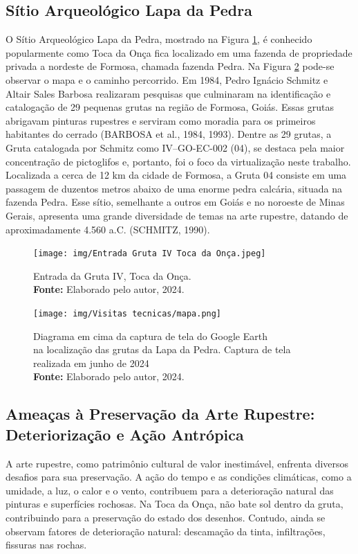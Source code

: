 \subsection {Sítio Arqueológico Lapa da Pedra}\label{sec:sitio lapa da pedra}
O Sítio Arqueológico Lapa da Pedra, mostrado na Figura \ref{fig:Entrada da Gruta IV,Toca da Onça}, é conhecido popularmente como Toca da Onça fica localizado em uma fazenda de propriedade privada a nordeste de Formosa, chamada fazenda Pedra. Na Figura \ref{fig:mapa} pode-se observar o mapa e o caminho percorrido. Em 1984, Pedro Ignácio Schmitz e Altair Sales Barbosa realizaram pesquisas que culminaram na identificação e catalogação de 29 pequenas grutas na região de Formosa, Goiás. Essas grutas abrigavam pinturas rupestres e serviram como moradia para os primeiros habitantes do cerrado (BARBOSA et al., 1984, 1993). 
Dentre as 29 grutas, a Gruta catalogada por Schmitz como IV–GO-EC-002 (04), se destaca pela maior concentração de pictoglifos e, portanto, foi o foco da virtualização neste trabalho. Localizada a cerca de 12 km da cidade de Formosa, a Gruta 04 consiste em uma passagem de duzentos metros abaixo de uma enorme pedra calcária, situada na fazenda Pedra. Esse sítio, semelhante a outros em Goiás e no noroeste de Minas Gerais, apresenta uma grande diversidade de temas na arte rupestre, datando de aproximadamente 4.560 a.C. (SCHMITZ, 1990).


\begin{figure}[H]
    \centering
    \texttt{[image: img/Entrada Gruta IV Toca da Onça.jpeg]}
    \caption{Entrada da Gruta IV, Toca da Onça. \\
        \textbf{Fonte:} Elaborado pelo autor, 2024.}
    \label{fig:Entrada da Gruta IV,Toca da Onça}
\end{figure}

\begin{figure}[H]
    \centering
    \texttt{[image: img/Visitas tecnicas/mapa.png]}
    \caption{ Diagrama em cima da captura de tela do Google Earth \\ na localização das grutas da Lapa da Pedra. Captura de tela realizada em junho de 2024 \\
        \textbf{Fonte:} Elaborado pelo autor, 2024.}
    \label{fig:mapa}
\end{figure}


\subsection{Ameaças à Preservação da Arte Rupestre: Deteriorização e Ação Antrópica}\label{sec:amecas a preservação}
A arte rupestre, como patrimônio cultural de valor inestimável, enfrenta diversos desafios para sua preservação. A ação do tempo e as condições climáticas, como a umidade, a luz, o calor e o vento, contribuem para a deterioração natural das pinturas e superfícies rochosas.
Na Toca da Onça,  não bate sol dentro da gruta, contribuindo para a preservação do estado dos desenhos. Contudo, ainda se observam fatores de deterioração natural: descamação da tinta, infiltrações, fissuras nas rochas.


